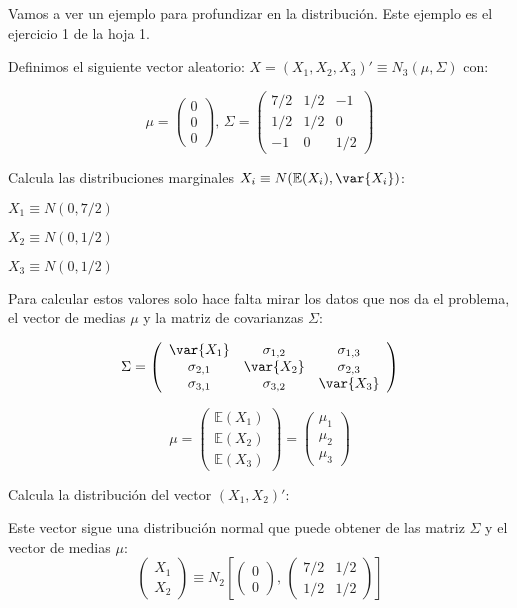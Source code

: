 Vamos a ver un ejemplo para profundizar en la distribución. Este ejemplo es el ejercicio 1 de la hoja 1. 
\begin{example}
Definimos el siguiente vector aleatorio: $X = (X_1,X_2,X_3)' \equiv N_3(\mu, \Sigma)$ con:

\[
\mu=
\left(
\begin{array}{c}
0\\
0\\
0
\end{array}
\right) \text{,       }
\Sigma=
\left(
\begin{array}{ccc}
7/2& 1/2& -1 \\
1/2& 1/2& 0 \\
-1& 0& 1/2
\end{array}
\right)
\]

\ppart Calcula las distribuciones marginales $X_i \equiv N(\mathbb{E}(X_i), \var{X_i})$:

$X_1\equiv N(0, 7/2)$

$X_2\equiv N(0, 1/2)$

$X_3\equiv N(0, 1/2)$

Para calcular estos valores solo hace falta mirar los datos que nos da el problema, el vector de medias $\mu$ y la matriz de covarianzas $\Sigma$:

\[
\Sigma=\left(
\begin{array}{ccc}
\var{X_1}& \sigma_{1,2}& \sigma_{1,3} \\
\sigma_{2,1}& \var{X_2}& \sigma_{2,3} \\
\sigma_{3,1}& \sigma_{3,2}& \var{X_3}
\end{array}
\right)
\]

\[
\mu=
\left(
\begin{array}{c}
\mathbb{E}(X_1)\\
\mathbb{E}(X_2)\\
\mathbb{E}(X_3)
\end{array}
\right)=
\left(
\begin{array}{c}
\mu_1\\
\mu_2\\
\mu_3
\end{array}
\right)
\]

\ppart Calcula la distribución del vector $(X_1,X_2)'$:

Este vector sigue una distribución normal que puede obtener de las matriz $\Sigma$ y el vector de medias $\mu$:
\[
\left(
\begin{array}{c}
X_1\\
X_2
\end{array}
\right)
\equiv N_2\left[
\left(
\begin{array}{c}
0\\
0
\end{array}
\right)
\text{, }
\left(
\begin{array}{cc}
7/2& 1/2 \\
1/2 & 1/2
\end{array}
\right)
\right]
\]


\end{example}
